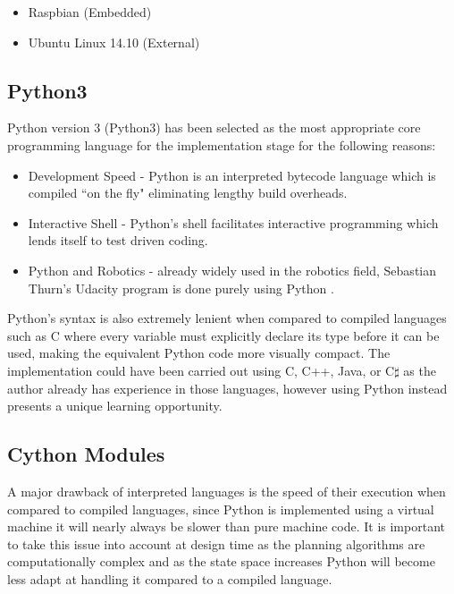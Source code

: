 \begin{itemize}
\item Raspbian (Embedded)
\item Ubuntu Linux 14.10 (External)
\end{itemize} 

\newpage

\subsection{Python3}
Python version 3 (Python3) has been selected as the most appropriate core programming language for the implementation stage for the following reasons:

\begin{itemize}
\item Development Speed - Python is an interpreted bytecode language which is compiled ``on the fly" eliminating lengthy build overheads.
\item Interactive Shell - Python's shell facilitates interactive programming which lends itself to test driven coding.
\item Python and Robotics - already widely used in the robotics field, Sebastian Thurn's Udacity program is done purely using Python \cite{THRUN}.
\end{itemize} 

\noindent
Python's syntax is also extremely lenient when compared to compiled languages such as C where every variable must explicitly declare its type before it can be used, making the equivalent Python code more visually compact. The implementation could have been carried out using C, C++, Java, or C$\sharp$ as the author already has experience in those languages, however using Python instead presents a unique learning opportunity. 

\subsection{Cython Modules}
\noindent
A major drawback of interpreted languages is the speed of their execution when compared to compiled languages, since Python is implemented using a virtual machine it will nearly always be slower than pure machine code. It is important to take this issue into account at design time as the planning algorithms are computationally complex and as the state space increases Python will become less adapt at handling it compared to a compiled language. \\

